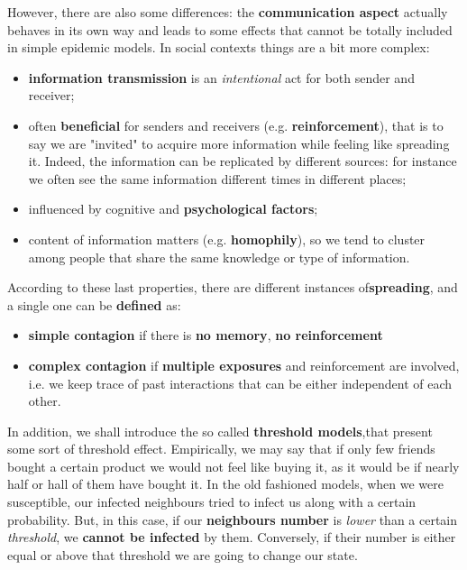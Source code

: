 \documentclass[../main/main.tex]{subfiles}
\begin{document}
However, there are also some differences: the \textbf{communication aspect} actually behaves in its own way and leads to some effects that cannot be totally included in simple epidemic models. In social contexts things are a bit more complex:
\begin{itemize}
\item \textbf{information transmission} is an \emph{intentional} act for both sender and receiver;

\item often \textbf{beneficial} for senders and receivers (e.g. \textbf{reinforcement}), that is to say we are "invited" to acquire more information while feeling like spreading it. Indeed, the information can be replicated by different sources: for instance we often see the same information different times in different places;

\item influenced by cognitive and \textbf{psychological factors};

\item content of information matters (e.g. \textbf{homophily}), so we tend to cluster among people that share the same knowledge or type of information.

\end{itemize}


According to these last properties, there are different instances of\textbf{spreading}, and a single one can be \textbf{defined} as:
\begin{itemize}
\item \textbf{simple contagion} if there is \textbf{no memory}, \textbf{no reinforcement} 
\item \textbf{complex contagion} if \textbf{multiple exposures} and reinforcement are involved, i.e. we keep trace of past interactions that can be either independent of each other.

\end{itemize}

In addition, we shall introduce the so called \textbf{threshold models},that present some sort of threshold effect. Empirically, we may say that if only few friends bought a certain product we would not feel like buying it, as it would be if nearly half or hall of them have bought it. In the old fashioned models, when we were susceptible, our infected neighbours tried to infect us along with a certain probability. But, in this case, if our \textbf{neighbours number} is \textit{lower} than a certain \textit{threshold}, we \textbf{cannot be infected} by them. Conversely, if their number is either equal or above that threshold we are going to change our state.
\end{document}
